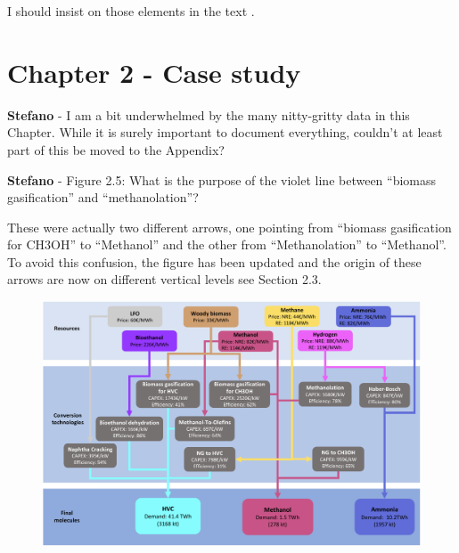 \documentclass[12pt,a4paper]{article}
\begin{document}
\noindent I should insist on those elements in the text {\color{blue} }.

\begin{mdframed}[style=manuscript] %

\end{mdframed}

\section{Chapter 2 - Case study}
\label{methodo}

\begin{mdframed}[style=comment] %
{\color{orange} \textbf{Stefano}} - I am a bit underwhelmed by the many nitty-gritty data in this Chapter. While it is surely important to document everything, couldn’t at least part of this be moved to the Appendix?\end{mdframed}

\noindent 

\begin{mdframed}[style=manuscript] %

\end{mdframed}

\begin{mdframed}[style=comment] %
{\color{orange} \textbf{Stefano}} - Figure 2.5: What is the purpose of the violet line between ``biomass gasification'' and ``methanolation''?
\end{mdframed}

\noindent These were actually two different arrows, one pointing from ``biomass gasification for CH3OH'' to ``Methanol'' and the other from ``Methanolation'' to ``Methanol''. To avoid this confusion, the figure has been updated and the origin of these arrows are now on different vertical levels {\color{blue} see Section 2.3}.

\begin{figure}[htbp!]
\centering
\includegraphics[width=\textwidth]{NED_tech.pdf}
\label{fig:NED_tech}
\end{figure}
\end{document}
